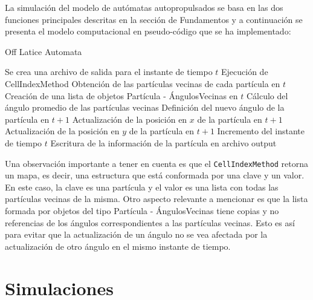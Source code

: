 \documentclass[11pt, a4paper]{article}
\begin{document}
            La simulación del modelo de autómatas autopropulsados se basa en las dos funciones principales descritas en la sección
            de Fundamentos y a continuación se presenta el modelo computacional en pseudo-código que se ha implementado:

            \begin{algorithm}
                \caption{Off Latice Automata}
                \begin{algorithmic}[1]
                    \State Se crea una archivo de salida para el instante de tiempo $t$
                            \State Ejecución de CellIndexMethod
                            \State Obtención de las partículas vecinas de cada partícula en $t$
                            \State Creación de una lista de objetos Partícula - ÁngulosVecinas en $t$
                                \State Cálculo del ángulo promedio de las partículas vecinas
                                \State Definición del nuevo ángulo de la partícula en $t+1$
                                \State Actualización de la posición en $x$ de la partícula en $t+1$
                                \State Actualización de la posición en $y$ de la partícula en $t+1$
                                \State Incremento del instante de tiempo $t$
                                \State Escritura de la información de la partícula en archivo output
                            \EndWhile
                        \EndWhile
                \end{algorithmic}
            \end{algorithm}

            Una observación importante a tener en cuenta es que el \texttt{CellIndexMethod} retorna un mapa, es decir, una estructura
            que está conformada por una clave y un valor. En este caso, la clave es una partícula y el valor es una lista con todas
            las partículas vecinas de la misma.
            Otro aspecto relevante a mencionar es que la lista formada por objetos del tipo Partícula - ÁngulosVecinas
            tiene copias y no referencias de los ángulos correspondientes a las partículas vecinas. Esto es así para evitar que la actualización de un
            ángulo no se vea afectada por la actualización de otro ángulo en el mismo instante de tiempo.

    \newpage

    \section{Simulaciones}
\end{document}
